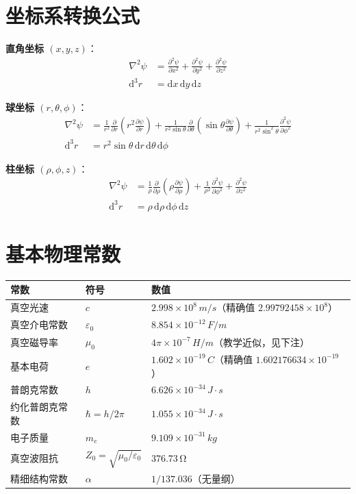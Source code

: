 \documentclass[11pt,a4paper,openany,oneside]{book}
\newcommand{\diff}{\mathrm{d}}
\newcommand{\eps}{\varepsilon}
\newcommand{\muz}{\mu_0}
\newcommand{\lap}{\nabla^2}
\begin{document}
\chapter{坐标系转换公式}

\textbf{直角坐标 $(x, y, z)$}：
\begin{align*}
\lap\psi &= \frac{\partial^2\psi}{\partial x^2} + \frac{\partial^2\psi}{\partial y^2} + \frac{\partial^2\psi}{\partial z^2} \\
\diff^3r &= \diff x\,\diff y\,\diff z
\end{align*}

\textbf{球坐标 $(r, \theta, \phi)$}：
\begin{align*}
\lap\psi &= \frac{1}{r^2}\frac{\partial}{\partial r}\left(r^2\frac{\partial\psi}{\partial r}\right) + \frac{1}{r^2\sin\theta}\frac{\partial}{\partial\theta}\left(\sin\theta\frac{\partial\psi}{\partial\theta}\right) + \frac{1}{r^2\sin^2\theta}\frac{\partial^2\psi}{\partial\phi^2} \\
\diff^3r &= r^2\sin\theta\,\diff r\,\diff\theta\,\diff\phi
\end{align*}

\textbf{柱坐标 $(\rho, \phi, z)$}：
\begin{align*}
\lap\psi &= \frac{1}{\rho}\frac{\partial}{\partial\rho}\left(\rho\frac{\partial\psi}{\partial\rho}\right) + \frac{1}{\rho^2}\frac{\partial^2\psi}{\partial\phi^2} + \frac{\partial^2\psi}{\partial z^2} \\
\diff^3r &= \rho\,\diff\rho\,\diff\phi\,\diff z
\end{align*}

\chapter{基本物理常数}

\begin{center}
\begin{tabular}{@{}lll@{}}
\toprule
\textbf{常数} & \textbf{符号} & \textbf{数值} \\
\midrule
真空光速 & $c$ & $2.998 \times 10^8 \, \si{m/s}$（精确值 $2.99792458\times10^8$） \\
真空介电常数 & $\eps_0$ & $8.854 \times 10^{-12} \, \si{F/m}$ \\
真空磁导率 & $\muz$ & $4\pi \times 10^{-7} \, \si{H/m}$（教学近似，见下注） \\
基本电荷 & $e$ & $1.602 \times 10^{-19} \, \si{C}$（精确值 $1.602176634\times10^{-19}$） \\
普朗克常数 & $h$ & $6.626 \times 10^{-34} \, \si{J\cdot s}$ \\
约化普朗克常数 & $\hbar = h/2\pi$ & $1.055 \times 10^{-34} \, \si{J\cdot s}$ \\
电子质量 & $m_e$ & $9.109 \times 10^{-31} \, \si{kg}$ \\
真空波阻抗 & $Z_0=\sqrt{\muz/\eps_0}$ & $376.73 \, \si{\ohm}$ \\
精细结构常数 & $\alpha$ & $1/137.036$（无量纲） \\
\bottomrule
\end{tabular}
\end{center}
\end{document}
